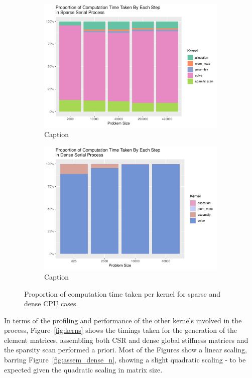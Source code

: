 \begin{figure}
	\centering
	\begin{subfigure}{0.48\linewidth}
		\centering
		\includegraphics[width = \linewidth]{Plots/prop_sparse}
		\caption{Caption}
		\label{fig:prop_sparse}
	\end{subfigure}\hfill
	\begin{subfigure}{0.48\linewidth}
		\centering
		\includegraphics[width=\linewidth]{Plots/prop_dense}
		\caption{Caption}
		\label{fig:prop_dense_cpu}
	\end{subfigure}
	\caption{Proportion of computation time taken per kernel for sparse and dense CPU cases.}
	\label{fig:prop_cpu}
\end{figure}

In terms of the profiling and performance of the other kernels involved in the process, Figure~\ref{fig:kerns} shows the timings taken for the generation of the element matrices, assembling both CSR and dense global stiffness matrices and the sparsity scan performed a priori. Most of the Figures show a linear scaling, barring Figure~\ref{fig:assem_dense_n}, showing a slight quadratic scaling - to be expected given the quadratic scaling in matrix size.

